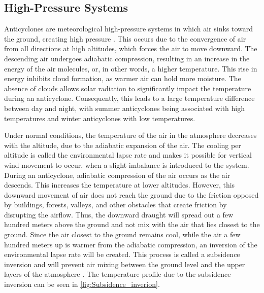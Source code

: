 \subsection{High-Pressure Systems}
Anticyclones are meteorological high-pressure systems in which air sinks toward the ground, creating high pressure \cite{spiridonovCyclonesAnticyclonesSpringerLink2020}. This occurs due to the convergence of air from all directions at high altitudes, which forces the air to move downward. The descending air undergoes adiabatic compression, resulting in an increase in the energy of the air molecules, or, in other words, a higher temperature. This rise in energy inhibits cloud formation, as warmer air can hold more moisture. The absence of clouds allows solar radiation to significantly impact the temperature during an anticyclone. Consequently, this leads to a large temperature difference between day and night, with summer anticyclones being associated with high temperatures and winter anticyclones with low temperatures. 

Under normal conditions, the temperature of the air in the atmosphere decreases with the altitude, due to the adiabatic expansion of the air. The cooling per altitude is called the environmental lapse rate and makes it possible for vertical wind movement to occur, when a slight imbalance is introduced to the system. During an anticyclone, adiabatic compression of the air occurs as the air descends. This increases the temperature at lower altitudes. However, this downward movement of air does not reach the ground due to the friction opposed by buildings, forests, valleys, and other obstacles that create friction by disrupting the airflow. Thus, the downward draught will spread out a few hundred meters above the ground and not mix with the air that lies closest to the ground. Since the air closest to the ground remains cool, while the air a few hundred meters up is warmer from the adiabatic compression, an inversion of the environmental lapse rate will be created. This process is called a subsidence inversion and will prevent air mixing between the ground level and the upper layers of the atmosphere \cite{gramschInfluenceSurfaceSubsidence2014}. The temperature profile due to the subsidence inversion can be seen in \autoref{fig:Subsidence_inverion}. 


